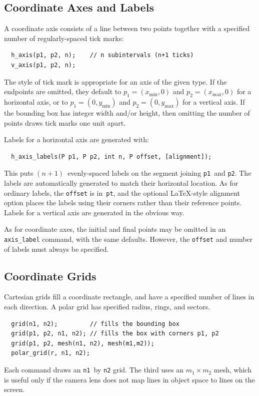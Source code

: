 \documentclass[12pt]{report}
\newcommand{\code}[1]{\texttt{#1}}
\begin{document}
\subsection*{Coordinate Axes and Labels} 

A coordinate axis consists of a line between two points together with
a specified number of regularly-spaced tick marks:
\begin{verbatim}
  h_axis(p1, p2, n);    // n subintervals (n+1 ticks)
  v_axis(p1, p2, n);
\end{verbatim}
The style of tick mark is appropriate for an axis of the given type.
If the endpoints are omitted, they default to $p_1=(x_\mathrm{min},0)$
and $p_2=(x_\mathrm{max},0)$ for a horizontal axis, or to
$p_1=(0,y_\mathrm{min})$ and $p_2=(0,y_\mathrm{max})$ for a vertical
axis. If the bounding box has integer width and/or
height, then omitting the number of points draws tick marks one unit
apart.

Labels for a horizontal axis are generated with:
\begin{verbatim}
  h_axis_labels(P p1, P p2, int n, P offset, [alignment]);
\end{verbatim}
This puts $(n+1)$~evenly-spaced labels on the segment joining
\code{p1}~and \code{p2}. The labels are automatically generated to
match their horizontal location. As for ordinary labels, the
\code{offset} is in~\code{pt}, and the optional \LaTeX-style alignment
option places the labels using their corners rather than their
reference points. Labels for a vertical axis are generated in
the obvious way.

As for coordinate axes, the initial and final points may be omitted in
an \code{axis\_label} command, with the same defaults.  However, the
\code{offset} and number of labels must always be specified.


\subsection*{Coordinate Grids} 

Cartesian grids fill a coordinate rectangle, and have a specified
number of lines in each direction. A polar grid has specified radius,
rings, and sectors.
\begin{verbatim}
  grid(n1, n2);         // fills the bounding box
  grid(p1, p2, n1, n2); // fills the box with corners p1, p2
  grid(p1, p2, mesh(n1, n2), mesh(m1,m2));
  polar_grid(r, n1, n2);
\end{verbatim}
Each command draws an \code{n1}~by \code{n2} grid. The third uses
an $m_1\times m_2$ mesh, which is useful only if the camera lens does
not map lines in object space to lines on the screen.
\end{document}
